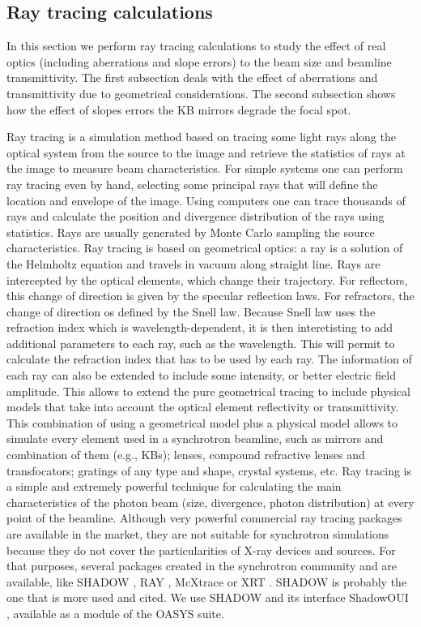 \documentclass{iucr}              %
\begin{document}
\subsection{Ray tracing calculations}
\label{level1}

In this section we perform ray tracing calculations to study the effect of real optics (including aberrations and slope errors) to the beam size and beamline transmittivity. The first subsection deals with the effect of aberrations and transmittivity due to geometrical considerations. The second subsection shows how the effect of slopes errors the KB mirrors degrade the focal spot.  

Ray tracing is a simulation method based on tracing some light rays along the optical system from the source to the image and retrieve the statistics of rays at the image to measure beam characteristics. For simple systems one can perform ray tracing even by hand, selecting some principal rays that will define the location and envelope of the image. Using computers one can trace thousands of rays and calculate the position and divergence distribution of the rays using statistics. Rays are usually generated by Monte Carlo sampling the source characteristics. Ray tracing is based on geometrical optics: a ray is a solution of the Helmholtz equation and travels in vacuum along straight line. Rays are intercepted by the optical elements, which change their trajectory. For reflectors, this change of direction is given by the specular reflection laws. For refractors, the change of direction os defined by the Snell law. Because Snell law uses the refraction index which is wavelength-dependent, it is then interetisting to add additional parameters to each ray, such as the wavelength. This will permit to calculate the refraction index that has to be used by each ray. The information of each ray can also be extended to include some intensity, or better electric field amplitude. This allows to extend the pure geometrical tracing to include physical models that take into account the optical element reflectivity or transmittivity. This combination of using a geometrical model plus a physical model allows to simulate every element used in a synchrotron beamline, such as mirrors and combination of them (e.g., KBs); lenses, compound refractive lenses and transfocators; gratings of any type and shape, crystal systems, etc. Ray tracing is a simple and extremely powerful technique for calculating the main characteristics of the photon beam (size, divergence, photon distribution) at every point of the beamline. Although very powerful commercial ray tracing packages are available in the market, they are not suitable for synchrotron simulations because they do not cover the particularities of X-ray devices and sources. For that purposes, several packages created in the synchrotron community and are available, like SHADOW \cite{codeSHADOW}, RAY \cite{codeRAY}, McXtrace \cite{codeMCXTRACE} or XRT \cite{codeXRT}. SHADOW is probably the one that is more used and cited. We use SHADOW and its interface ShadowOUI \cite{codeSHADOWOUI}, available as a module of the OASYS suite.
\end{document}
